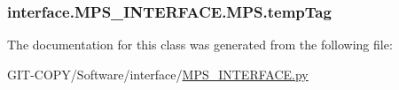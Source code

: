\subsubsection[{temp\+Tag}]{\setlength{\rightskip}{0pt plus 5cm}interface.\+M\+P\+S\+\_\+\+I\+N\+T\+E\+R\+F\+A\+C\+E.\+M\+P\+S.\+temp\+Tag}\label{classinterface_1_1MPS__INTERFACE_1_1MPS_a7290342997a971ce72256ac74b88a2cd}


The documentation for this class was generated from the following file\+:\begin{DoxyCompactItemize}
\item 
G\+I\+T-\/\+C\+O\+P\+Y/\+Software/interface/\hyperlink{GIT-COPY_2Software_2interface_2MPS__INTERFACE_8py}{M\+P\+S\+\_\+\+I\+N\+T\+E\+R\+F\+A\+C\+E.\+py}\end{DoxyCompactItemize}
